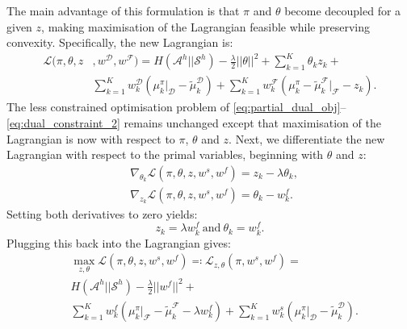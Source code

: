 \documentclass[letterpaper]{article}
\newcommand{\sw}[1]{\textcolor{red}{SW: #1}}
\newcommand{\jm}[1]{\textcolor{blue}{Joao: #1}}
\newcommand{\ks}[1]{\textcolor{green}{Kyriacos: #1}}
\newcommand{\sw}[1]{}
\newcommand{\jm}[1]{}
\newcommand{\ks}[1]{}
\begin{document}
The main advantage of this formulation is that $\pi$ and $\theta$ become decoupled for a given $z$, making maximisation of the Lagrangian feasible while preserving convexity. 
Specifically, the new Lagrangian is:
\begin{equation}
\begin{split}
\label{eq:partial_lagrangian_failure}
\mathcal{L}(\pi,\theta,z &,w^{\mathcal{D}},w^{\mathcal{F}})=  H(\mathcal{A}^h||\mathcal{S}^h) - \frac{\lambda}{2}||\theta||^2 + \sum_{k=1}^K\theta_kz_k+\\
&
\sum_{k=1}^Kw^{\mathcal{D}}_k(\mu^{\pi}_k|_{\mathcal{D}}-\widetilde{\mu}^{\mathcal{D}}_k) + 
\sum_{k=1}^Kw^{\mathcal{F}}_k (\mu^{\pi}_k -\widetilde{\mu}^{\mathcal{F}}_k|_{\mathcal{F}} - z_k).
\end{split}
\end{equation}
The less constrained optimisation problem of \eqref{eq:partial_dual_obj}--\eqref{eq:dual_constraint_2} remains unchanged except that maximisation of the Lagrangian is now with respect to $\pi$, $\theta$ and $z$.
Next, we differentiate the new Lagrangian with respect to the primal variables, beginning with $\theta$ and $z$:
\begin{align}
	&\nabla_{\theta_k}\mathcal{L}(\pi,\theta,z,w^s,w^f) = z_k - \lambda\theta_k,\\
	&\nabla_{z_k}\mathcal{L}(\pi,\theta,z,w^s,w^f) = \theta_k - w^f_k.
\end{align}
Setting both derivatives to zero yields:
\begin{equation}
	z_k = \lambda w^f_k~\mathrm{and}~\theta_k = w^f_k.
\end{equation}
Plugging this back into the Lagrangian gives:
\begin{equation}
\begin{split}
\label{eq:partial_lagrangian_failure}
&\max_{z,\theta}\mathcal{L}(\pi,\theta,z,w^s,w^f)\eqqcolon \mathcal{L}_{z,\theta}(\pi,w^s,w^f) =\\& H(\mathcal{A}^h||\mathcal{S}^h) - \frac{\lambda}{2}||w^f||^2 +\\ 
&\sum_{k=1}^Kw^f_k (\mu^{\pi}_k|_{\mathcal{F}} -\widetilde{\mu}^{\mathcal{F}}_k-\lambda w^f_k) + \sum_{k=1}^Kw^s_k(\mu^{\pi}_k|_{\mathcal{D}}-\widetilde{\mu}^{\mathcal{D}}_k).
\end{split}
\end{equation}
\end{document}
